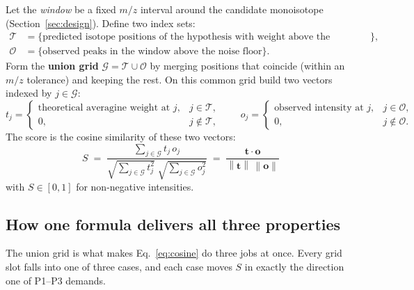 \documentclass[11pt]{article}
\newcommand{\tvec}{\mathbf{t}}
\newcommand{\ovec}{\mathbf{o}}
\newcommand{\norm}[1]{\left\lVert #1 \right\rVert}
\begin{document}
Let the \emph{window} be a fixed $m/z$ interval around the candidate monoisotope
(Section~\ref{sec:design}). Define two index sets:
\begin{align*}
\mathcal{T} &= \{\text{predicted isotope positions of the hypothesis with weight above the significance cutoff}\},\\
\mathcal{O} &= \{\text{observed peaks in the window above the noise floor}\}.
\end{align*}
Form the \textbf{union grid} $\mathcal{G} = \mathcal{T} \cup \mathcal{O}$ by merging
positions that coincide (within an $m/z$ tolerance) and keeping the rest. On this
common grid build two vectors indexed by $j \in \mathcal{G}$:
\[
t_j = \begin{cases} \text{theoretical averagine weight at } j, & j \in \mathcal{T},\\[2pt] 0, & j \notin \mathcal{T},\end{cases}
\qquad
o_j = \begin{cases} \text{observed intensity at } j, & j \in \mathcal{O},\\[2pt] 0, & j \notin \mathcal{O}.\end{cases}
\]
The score is the cosine similarity of these two vectors:
\begin{equation}
\boxed{\;
S \;=\; \frac{\sum_{j\in\mathcal{G}} t_j\, o_j}
             {\sqrt{\sum_{j\in\mathcal{G}} t_j^2}\;\sqrt{\sum_{j\in\mathcal{G}} o_j^2}}
   \;=\; \frac{\tvec\cdot\ovec}{\norm{\tvec}\,\norm{\ovec}}\; }
\label{eq:cosine}
\end{equation}
with $S \in [0,1]$ for non-negative intensities.

\subsection{How one formula delivers all three properties}

The union grid is what makes Eq.~\eqref{eq:cosine} do three jobs at once. Every grid
slot falls into one of three cases, and each case moves $S$ in exactly the direction
one of P1--P3 demands.
\end{document}
